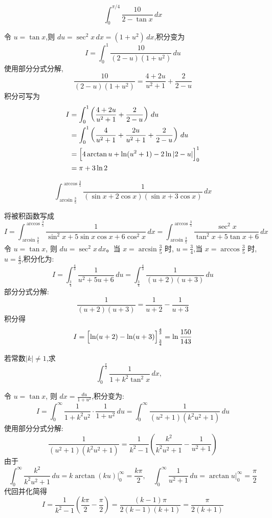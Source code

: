 \begin{questions}
    \question 
    \[
    \int_{0}^{\pi/4} \frac{10}{2 - \tan x} \,dx
    \]
    \begin{solution}
        令 $u = \tan x$,则 $du= \sec^2 x \, dx = (1+u^2)\, dx$,积分变为
        \[
        I=\int_{0}^{1} \frac{10}{(2-u)(1+u^2)} \,du
        \]
        使用部分分式分解,
        \[
        \frac{10}{(2-u)(1+u^2)} = \frac{4+2u}{u^2+1} + \frac{2}{2-u} 
        \]
        积分可写为
        \begin{align*}
        I&=\int_{0}^{1} \left( \frac{4+2u}{u^2+1} + \frac{2}{2-u} \right) \,du \\
        &= \int_{0}^{1} \left( \frac{4}{u^2+1} + \frac{2u}{u^2+1} + \frac{2}{2-u} \right) \,du \\
        &= \Bigl[ 4\arctan u + \ln(u^2+1) - 2\ln|2-u| \Bigr]_{0}^{1} \\
        &= \pi + 3\ln 2
        \end{align*}
    \end{solution}

    \question
    \[
    \int_{\arcsin \frac{3}{5}}^{\arccos \frac{3}{5}} \frac{1}{(\sin x+2\cos x)(\sin x+3\cos x)} \,dx
    \]
    \begin{solution}
        将被积函数写成
        \[
        I = \int_{\arcsin \frac{3}{5}}^{\arccos \frac{3}{5}} \frac{1}{\sin^2 x+5\sin x\cos x+6\cos^2 x} \,dx = \int_{\arcsin \frac{3}{5}}^{\arccos \frac{3}{5}} \frac{\sec^2 x}{\tan^2 x + 5\tan x + 6} \,dx
        \]
        令 $u=\tan x$, 则 $du=\sec^2 x \,dx$。当 $x = \arcsin \frac{3}{5}$ 时, $u = \frac{3}{4}$,当 $x = \arccos \frac{3}{5}$ 时, $u = \frac{4}{3}$,积分化为:
        \[
        I = \int_{\frac{3}{4}}^{\frac{4}{3}} \frac{1}{u^2+5u+6} \,du = \int_{\frac{3}{4}}^{\frac{4}{3}} \frac{1}{(u+2)(u+3)} \,du
        \]
        部分分式分解:
        \[
        \frac{1}{(u+2)(u+3)} = \frac{1}{u+2} - \frac{1}{u+3}
        \]
        积分得
        \[
        I = \Bigl[\ln(u+2) - \ln(u+3)\Bigr]_{\frac{3}{4}}^{\frac{4}{3}} = \ln\frac{150}{143}
        \]
    \end{solution}

    \question 若常数$|k| \neq 1$,求
    \[
    \int_{0}^{\frac{\pi}{2}} \frac{1}{1+k^2 \tan^2 x} \,dx, \quad 
    \]
    \begin{solution}
        令 $u = \tan x$, 则 $dx = \frac{du}{1+u^2}$,积分变为:
        \[
        I = \int_{0}^{\infty} \frac{1}{1+k^2 u^2} \cdot \frac{1}{1+u^2} \,du = \int_{0}^{\infty} \frac{1}{(u^2+1)(k^2 u^2+1)} \,du
        \]
        使用部分分式分解:
        \[
        \frac{1}{(u^2+1)(k^2 u^2+1)} = \frac{1}{k^2-1} \left( \frac{k^2}{k^2 u^2+1} - \frac{1}{u^2+1} \right)
        \]
        由于
        \[
        \int_{0}^{\infty} \frac{k^2}{k^2 u^2+1} \,du = k \arctan(ku) \Big|_{0}^{\infty} = \frac{k\pi}{2}, \quad \int_{0}^{\infty} \frac{1}{u^2+1} \,du = \arctan u \Big|_{0}^{\infty} = \frac{\pi}{2}
        \]
        代回并化简得
        \[
        I = \frac{1}{k^2-1} \left( \frac{k\pi}{2} - \frac{\pi}{2} \right) = \frac{(k-1)\pi}{2(k-1)(k+1)} = \frac{\pi}{2(k+1)}
        \]
    \end{solution}


\end{questions}
